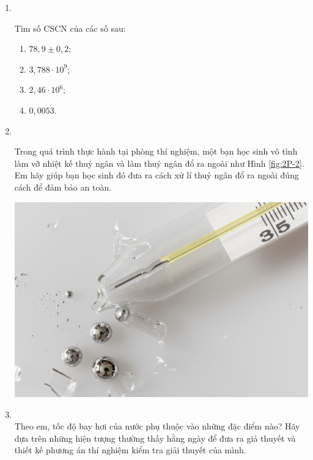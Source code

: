 \let\lesson\undefined
\newcommand{\lesson}{\phantomlesson{Bài 3.}}


\setcounter{section}{0}
\begin{enumerate}[label=\bfseries Bài \arabic*:]
	\item{}\\
	{Tìm số CSCN của các số sau:
		\begin{enumerate}[label=\alph*)]
			\item $78,9\pm 0,2$;
			\item $3,788\cdot10^9$;
			\item $2,46\cdot10^6$;
			\item $0,0053$.
		\end{enumerate}
}
	\item {}\\
	{Trong quá trình thực hành tại phòng thí nghiệm, một bạn học sinh vô tình làm vỡ nhiệt kế thuỷ ngân và làm thuỷ ngân đổ ra ngoài như Hình \ref{fig:2P-2}. Em hãy giúp bạn học sinh đó đưa ra cách xử lí thuỷ ngân đổ ra ngoài đúng cách để đảm bảo an toàn.
		\begin{center}
			\includegraphics[width=0.3\linewidth]{../figs/VN10-2022-PH-TP002-P-2}
			\label{fig:2P-2}
		\end{center}
	}
	
	\item {}\\
	{Theo em, tốc độ bay hơi của nước phụ thuộc vào những đặc điểm nào? Hãy dựa trên những hiện tượng thường thấy hằng ngày để đưa ra giả thuyết và thiết kế phương án thí nghiệm kiểm tra giải thuyết của mình.
	}
	

\end{enumerate}
